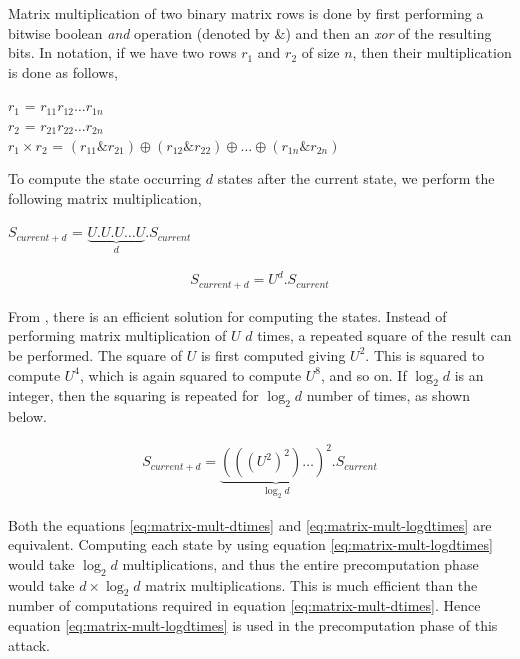 Matrix multiplication of two binary matrix rows is done by first performing a bitwise boolean \emph{and} operation (denoted by \&) and then an \emph{xor} of the resulting bits. In notation, if we have two rows $r_1$ and $r_2$ of size $n$, then their multiplication is done as follows,

\begin{center}
$r_1$ = $r_{11} r_{12} \ldots r_{1n}$\\
$r_2$ = $r_{21} r_{22} \ldots r_{2n}$\\
$r_1 \times r_2$ = $(r_{11} \& r_{21}) \oplus (r_{12} \& r_{22}) \oplus \ldots \oplus (r_{1n} \& r_{2n})$
\end{center}

To compute the state occurring $d$ states after the current state, we perform the following matrix multiplication,

\begin{center}
$S_{current + d}$ = $\underbrace{U . U . U \dots U}_{d} . S_{current}$\\
\end{center}

\begin{align}
\label{eq:matrix-mult-dtimes} S_{current + d} = U^d . S_{current}
\end{align}

From \cite{erik-discussions}, there is an efficient solution for computing the states. Instead of performing matrix multiplication of $U$ $d$ times, a repeated square of the result can be performed. The square of $U$ is first computed giving $U^2$. This is squared to compute $U^4$, which is again squared to compute $U^8$, and so on. If $\log_2{d}$ is an integer, then the squaring is repeated for $\log_2{d}$ number of times, as shown below.

\begin{align}
\label{eq:matrix-mult-logdtimes} S_{current + d} = \underbrace{(((U^2)^2) \dotsc )^2}_{\log_2{d}} . S_{current}
\end{align}

Both the equations \ref{eq:matrix-mult-dtimes} and \ref{eq:matrix-mult-logdtimes} are equivalent. Computing each state by using equation \ref{eq:matrix-mult-logdtimes} would take $\log_2{d}$ multiplications, and thus the entire precomputation phase would take $d \times \log_2{d}$ matrix multiplications. This is much efficient than the number of computations required in equation \ref{eq:matrix-mult-dtimes}. Hence equation \ref{eq:matrix-mult-logdtimes} is used in the precomputation phase of this attack.

